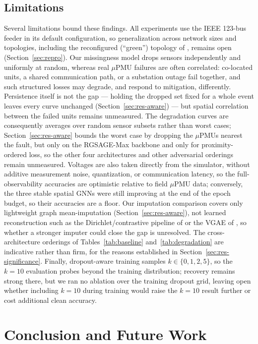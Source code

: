 \documentclass[3p,times,procedia]{elsarticle}
\begin{document}
\subsection{Limitations}

Several limitations bound these findings. All experiments use the IEEE 123-bus feeder in its default configuration, so generalization across network sizes and topologies, including the reconfigured (``green'') topology of \cite{Karabulut2026}, remains open (Section~\ref{sec:repro}). Our missingness model drops sensors independently and uniformly at random, whereas real $\mu$PMU failures are often correlated: co-located units, a shared communication path, or a substation outage fail together, and such structured losses may degrade, and respond to mitigation, differently. Persistence itself is not the gap --- holding the dropped set fixed for a whole event leaves every curve unchanged (Section~\ref{sec:res-aware}) --- but spatial correlation between the failed units remains unmeasured. The degradation curves are consequently averages over random sensor subsets rather than worst cases; Section~\ref{sec:res-aware} bounds the worst case by dropping the $\mu$PMUs nearest the fault, but only on the RGSAGE-Max backbone and only for proximity-ordered loss, so the other four architectures and other adversarial orderings remain unmeasured. Voltages are also taken directly from the simulator, without additive measurement noise, quantization, or communication latency, so the full-observability accuracies are optimistic relative to field $\mu$PMU data; conversely, the three stable spatial GNNs were still improving at the end of the epoch budget, so their accuracies are a floor. Our imputation comparison covers only lightweight graph mean-imputation (Section~\ref{sec:res-aware}), not learned reconstruction such as the Dirichlet/contrastive pipeline of \cite{zhang2025} or the VGAE of \cite{fan2024}, so whether a stronger imputer could close the gap is unresolved. The cross-architecture orderings of Tables~\ref{tab:baseline} and~\ref{tab:degradation} are indicative rather than firm, for the reasons established in Section~\ref{sec:res-significance}. Finally, dropout-aware training samples $k\in\{0,1,2,5\}$, so the $k=10$ evaluation probes beyond the training distribution; recovery remains strong there, but we ran no ablation over the training dropout grid, leaving open whether including $k=10$ during training would raise the $k=10$ result further or cost additional clean accuracy.

\section{Conclusion and Future Work}
\label{sec:conclusion}
\end{document}
